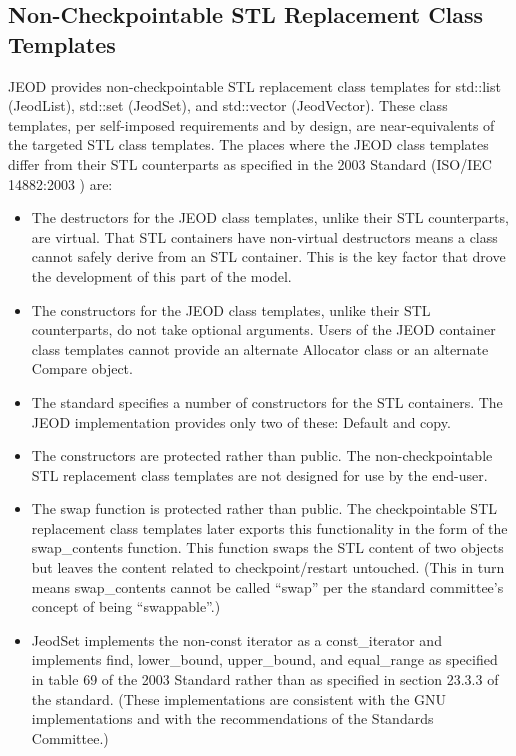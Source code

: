 \subsection{Non-Checkpointable STL Replacement Class Templates}
\label{sec:spec_noncheckpointable_stl_replacements}
JEOD provides non-checkpointable STL replacement class templates for
std::list (JeodList), std::set (JeodSet), and std::vector (JeodVector).
These class templates, per self-imposed requirements and by design,
are near-equivalents of the targeted STL class templates. The places where
the JEOD class templates differ from their STL counterparts as specified
in the 2003 \Cplusplus Standard (ISO/IEC 14882:2003 \cite{cpp2003}) are:
\begin{itemize}
\item The destructors for the JEOD class templates, unlike their STL
counterparts, are virtual. That STL containers have non-virtual
destructors means a class cannot safely derive from an STL container.
This is the key factor that drove the development of
this part of the model.
\item The constructors for the JEOD class templates, unlike their STL
counterparts, do not take optional arguments. Users of the JEOD container
class templates cannot provide an alternate Allocator class or
an alternate Compare object.
\item The standard specifies a number of constructors for the STL containers.
The JEOD implementation provides only two of these: Default and copy.
\item The constructors are protected rather than public. The non-checkpointable
STL replacement class templates are not designed for use by the end-user.
\item The swap function is protected rather than public. The checkpointable
STL replacement class templates later exports this functionality in the form of
the swap\_contents function. This function swaps the STL content of two
objects but leaves the content related to checkpoint/restart untouched.
(This in turn means swap\_contents cannot be called ``swap'' per the
standard committee's concept of being ``swappable''.)
\item JeodSet implements the non-const iterator as a const\_iterator and
implements find, lower\_bound, upper\_bound, and equal\_range as specified
in table 69 of the 2003 \Cplusplus Standard rather than as specified in
section 23.3.3 of the standard. (These implementations are consistent with the
GNU implementations and with the recommendations of the
\Cplusplus Standards Committee.)
\end{itemize}

